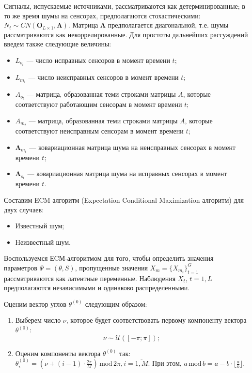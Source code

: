 \documentclass[11pt]{article}
\begin{document}
Сигналы, испускаемые источниками, рассматриваются как детерминированные; в то же время шумы на сенсорах, предполагаются стохастическими: $N_t \sim CN(\mathbf{O}_{L \times 1}, \mathbf{\Lambda})$. Матрица $\mathbf{\Lambda}$ предполагается диагональной, т.е. шумы рассматриваются как некоррелированные. Для простоты дальнейших рассуждений введем также следующие величины:
\begin{itemize}
\item
$L_{o_t}$ --- число исправных сенсоров в момент времени $t$;
\item
 $L_{m_t}$ --- число неисправных сенсоров в момент времени $t$;
\item 
$A_{o_t}$ --- матрица, образованная теми строками матрицы $A$, которые соответствуют работающим сенсорам в момент времени $t$; 
\item
$A_{m_t}$ --- матрица, образованная теми строками матрицы $A$, которые соответствуют неисправным сенсорам в момент времени $t$;
\item
$\mathbf{\Lambda}_{m_t}$ --- ковариационная матрица шума на неисправных сенсорах в момент времени $t$;
\item 
 $\mathbf{\Lambda}_{o_t}$ --- ковариационная матрица шума на исправных сенсорах в момент времени $t$.
\end{itemize}
Составим ECM-алгоритм (Expectation Conditional Maximization алгоритм) для двух случаев:
\begin{itemize}
\item
Известный шум;
\item
Неизвестный шум.
\end{itemize}
\clearpage
\begin{center}
\fontsize{16}{20}\selectfont {}
\end{center}
Воспользуемся ЕCМ-алгоритмом для того, чтобы определить значения параметров $\Psi = (\theta, S)$, пропущенные значения $X_m=\{X_{m_t}\}_{t=1}^G$ рассматриваются как латентные переменные. Наблюдения $X_t$, $t=\overline{1,L}$ предполагаются независимыми и одинаково распределенными.
\begin{center}
\fontsize{14}{18}\selectfont {}
\end{center}
Оценим вектор углов $\theta^{(0)}$ следующим образом:
\begin{enumerate}
\item
Выберем число $\nu$, которое будет соответствовать первому компоненту вектора $\theta^{(0)}$:
\begin{equation}
\nu \sim \mathcal{U}([-\pi;\pi]);
\end{equation}
\item
Оценим компоненты вектора $\theta^{(0)}$ так:  $\theta^{(0)}_i = (\nu + (i-1)\cdot \frac{2\pi}{M})\, \text{mod} \, 2\pi, i = \overline{1,M}$. При этом,  $a \, \text{mod} \, b = a - b \cdot \lfloor \frac{a}{b} \rfloor$.
\end{enumerate}
\end{document}
